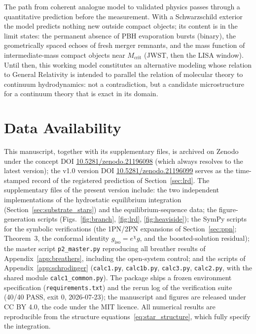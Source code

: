 \documentclass[11pt,a4paper]{article}
\theoremstyle{plain}
\theoremstyle{remark}
\begin{document}
The path from coherent analogue model to validated physics passes through a quantitative prediction before the measurement. With a Schwarzschild exterior the model predicts nothing new outside compact objects; its content is in the limit states: the permanent absence of PBH evaporation bursts (binary), the geometrically spaced echoes of fresh merger remnants, and the mass function of intermediate-mass compact objects near $M_{\text{crit}}$ (JWST, then the LISA window). Until then, this working model constitutes an alternative modeling whose relation to General Relativity is intended to parallel the relation of molecular theory to continuum hydrodynamics: not a contradiction, but a candidate microstructure for a continuum theory that is exact in its domain.

\section*{Data Availability}
This manuscript, together with its supplementary files, is archived on Zenodo under the concept DOI \href{https://doi.org/10.5281/zenodo.21196098}{10.5281/zenodo.21196098} (which always resolves to the latest version); the v1.0 version DOI \href{https://doi.org/10.5281/zenodo.21196099}{10.5281/zenodo.21196099} serves as the time-stamped record of the registered prediction of Section~\ref{sec:lrd}. The supplementary files of the present version include: the two independent implementations of the hydrostatic equilibrium integration (Section~\ref{sec:substrate_stars}) and the equilibrium-sequence data; the figure-generation scripts (Figs.~\ref{fig:branch}, \ref{fig:lrd}, \ref{fig:heaviside}); the SymPy scripts for the symbolic verifications (the 1PN/2PN expansions of Section~\ref{sec:ppn}; Theorem~3, the conformal identity $g_{\text{iso}} = e^{\chi}g$, and the boosted-solution residual); the master script \texttt{p2\_master.py} reproducing all breather results of Appendix~\ref{app:breathers}, including the open-system control; and the scripts of Appendix~\ref{app:schrodinger} (\texttt{calc1.py}, \texttt{calc1b.py}, \texttt{calc3.py}, \texttt{calc2.py}, with the shared module \texttt{calc1\_common.py}). The package ships a frozen environment specification (\texttt{requirements.txt}) and the rerun log of the verification suite (40/40 PASS, exit 0, 2026-07-23); the manuscript and figures are released under CC BY 4.0, the code under the MIT licence. All numerical results are reproducible from the structure equations~\eqref{eq:star_structure}, which fully specify the integration.
\end{document}
